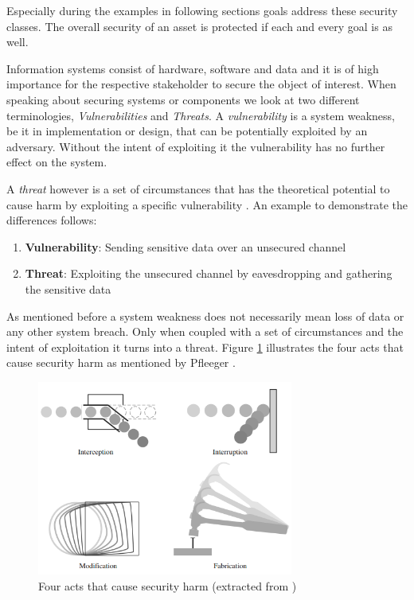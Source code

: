 Especially during the examples in following sections goals address these security classes. The overall security of an asset is protected if each and every goal is as well.

Information systems consist of hardware, software and data and it is of high importance for the respective stakeholder to secure the object of interest. When speaking about securing systems or components we look at two different terminologies, \textit{Vulnerabilities} and \textit{Threats}. A \textit{vulnerability} is a system weakness, be it in implementation or design, that can be potentially exploited by an adversary. Without the intent of exploiting it the vulnerability has no further effect on the system.

A \textit{threat} however is a set of circumstances that has the theoretical potential to cause harm by exploiting a specific vulnerability \cite{vacca2012computer}. An example to demonstrate the differences follows:

\begin{enumerate}
\item[] \textbf{Vulnerability}: Sending sensitive data over an unsecured channel \label{item:vuln}
\item[] \textbf{Threat}: Exploiting the unsecured channel by eavesdropping and gathering the sensitive data 
\end{enumerate}

As mentioned before a system weakness does not necessarily mean loss of data or any other system breach. Only when coupled with a set of circumstances and the intent of exploitation it turns into a threat. Figure \ref{fig:threats} illustrates the four acts that cause security harm as mentioned by Pfleeger \cite{Pfleeger:2006:SC:1177321}. 

\begin{figure}[H]
\centering
\includegraphics[width=0.75\textwidth]{pictures/threats.png}
\caption{Four acts that cause security harm (extracted from \cite{Pfleeger:2006:SC:1177321})}
\label{fig:threats}
\end{figure}

